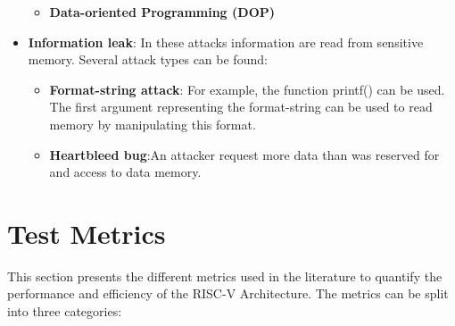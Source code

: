 \documentclass{book}
\begin{document}
\begin{itemize}
\begin{itemize}
					\item \textbf{Data-oriented Programming (DOP)}
				\end{itemize}
				\item \textbf{Information leak}: In these attacks information are read from sensitive memory. Several attack types can be found:
				\begin{itemize}
					\item \textbf{Format-string attack}: For example, the function printf() can be used. The first argument representing the format-string can be used to read memory by manipulating this format.
					\item \textbf{Heartbleed bug}:An attacker request more data than was reserved for and access to data memory.
				\end{itemize}
			\end{itemize}
	
		\section{Test Metrics}
		
			This section presents the different metrics used in the literature to quantify the performance and efficiency of the RISC-V Architecture. The metrics can be split into three categories:
			
\end{document}
